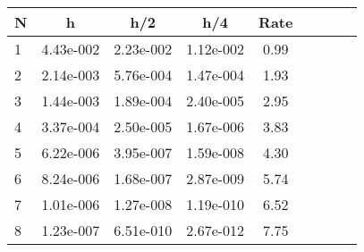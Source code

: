 \begin{tabular}{lcccccccc}
N & h & h/2 & h/4 & Rate\\
\hline
1& 4.43e-002& 2.23e-002& 1.12e-002& 0.99\\
2& 2.14e-003& 5.76e-004& 1.47e-004& 1.93\\
3& 1.44e-003& 1.89e-004& 2.40e-005& 2.95\\
4& 3.37e-004& 2.50e-005& 1.67e-006& 3.83\\
5& 6.22e-006& 3.95e-007& 1.59e-008& 4.30\\
6& 8.24e-006& 1.68e-007& 2.87e-009& 5.74\\
7& 1.01e-006& 1.27e-008& 1.19e-010& 6.52\\
8& 1.23e-007& 6.51e-010& 2.67e-012& 7.75\\
\hline
\end{tabular}
